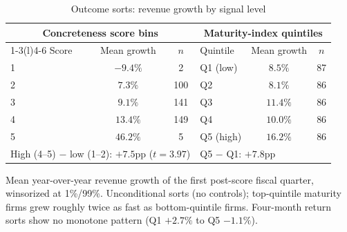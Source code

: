 \documentclass[11pt]{article}
\begin{document}
\begin{table}[H]
\centering
\begin{threeparttable}
\caption{Outcome sorts: revenue growth by signal level}
\label{tab:sorts}
\small
\begin{tabular}{lcc@{\hskip 2em}lcc}
\toprule
\multicolumn{3}{c}{Concreteness score bins} & \multicolumn{3}{c}{Maturity-index quintiles}\\
\cmidrule(r){1-3}\cmidrule(l){4-6}
Score & Mean growth & $n$ & Quintile & Mean growth & $n$\\
\midrule
1 & $-9.4\%$ & 2 & Q1 (low) & $8.5\%$ & 87\\
2 & $7.3\%$ & 100 & Q2 & $8.1\%$ & 86\\
3 & $9.1\%$ & 141 & Q3 & $11.4\%$ & 86\\
4 & $13.4\%$ & 149 & Q4 & $10.0\%$ & 86\\
5 & $46.2\%$ & 5 & Q5 (high) & $16.2\%$ & 86\\
\midrule
\multicolumn{3}{l}{High (4--5) $-$ low (1--2): $+7.5$pp ($t=3.97$)} &
\multicolumn{3}{l}{Q5 $-$ Q1: $+7.8$pp}\\
\bottomrule
\end{tabular}
\begin{tablenotes}\footnotesize
\item Mean year-over-year revenue growth of the first post-score fiscal
quarter, winsorized at 1\%/99\%. Unconditional sorts (no controls); top-quintile
maturity firms grew roughly twice as fast as bottom-quintile firms. Four-month
return sorts show no monotone pattern (Q1 $+2.7\%$ to Q5 $-1.1\%$).
\end{tablenotes}
\end{threeparttable}
\end{table}
\end{document}
